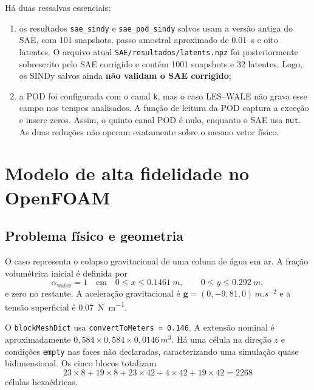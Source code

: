 \documentclass[12pt,a4paper]{article}
\newcommand{\code}[1]{\texttt{#1}}
\begin{document}
Há duas ressalvas essenciais:
\begin{enumerate}[label=\arabic*)]
  \item os resultados \code{sae\_sindy} e \code{sae\_pod\_sindy} salvos usam a versão antiga do SAE, com 101 snapshots, passo amostral aproximado de \SI{0.01}{s} e oito latentes. O arquivo atual \code{SAE/resultados/latents.npz} foi posteriormente sobrescrito pelo SAE corrigido e contém 1001 snapshots e 32 latentes. Logo, os SINDy salvos ainda \textbf{não validam o SAE corrigido};
  \item a POD foi configurada com o canal \code{k}, mas o caso LES--WALE não grava esse campo nos tempos analisados. A função de leitura da POD captura a exceção e insere zeros. Assim, o quinto canal POD é nulo, enquanto o SAE usa \code{nut}. As duas reduções não operam exatamente sobre o mesmo vetor físico.
\end{enumerate}

\section{Modelo de alta fidelidade no OpenFOAM}

\subsection{Problema físico e geometria}
O caso representa o colapso gravitacional de uma coluna de água em ar. A fração volumétrica inicial é definida por
\begin{equation}
  \alpha_{\mathrm{water}}=1 \quad \text{em}\quad
  0\le x\le \SI{0.1461}{m},\qquad 0\le y\le \SI{0.292}{m},
\end{equation}
e zero no restante. A aceleração gravitacional é $\mathbf{g}=(0,-9{,}81,0)\,\si{m.s^{-2}}$ e a tensão superficial é \SI{0.07}{N.m^{-1}}.

O \code{blockMeshDict} usa \code{convertToMeters = 0.146}. A extensão nominal é aproximadamente $0{,}584\times0{,}584\times0{,}0146\,\si{m^3}$. Há uma célula na direção $z$ e condições \code{empty} nas faces não declaradas, caracterizando uma simulação quase bidimensional. Os cinco blocos totalizam
\begin{equation}
23\times8+19\times8+23\times42+4\times42+19\times42=2268
\end{equation}
células hexaédricas.
\end{document}

